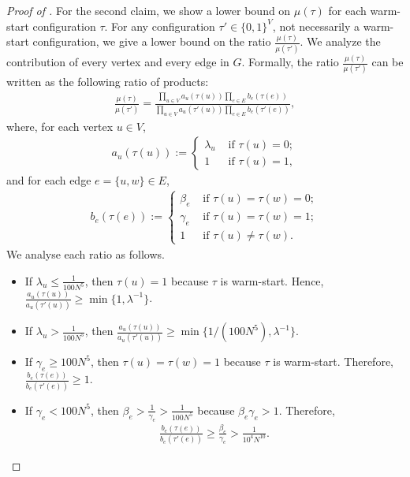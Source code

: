 \documentclass[10pt,a4paper]{amsart}
\newcommand{\defeq}{:=}
\begin{document}
\begin{proof}[Proof of ]
For the second claim, we show a lower bound on $\mu(\tau)$ for each warm-start configuration $\tau$. For any configuration $\tau' \in \{0,1\}^{V}$, not necessarily a warm-start configuration, we give a lower bound on the ratio $\frac{\mu(\tau)}{\mu(\tau')}$. We analyze the contribution of every vertex and every edge in $G$. Formally, the ratio $\frac{\mu(\tau)}{\mu(\tau')}$ can be written as the following ratio of products:
\begin{align*}
  \frac{\mu(\tau)}{\mu(\tau')} = \frac{ \prod_{u \in V} a_u(\tau(u)) \prod_{e \in E} b_e(\tau(e)) }{ \prod_{u \in V} a_u(\tau'(u)) \prod_{e \in E} b_e(\tau'(e)) },
\end{align*}
where, for each vertex $u \in V$,
\begin{align*}
  a_u(\tau(u))\defeq
  \begin{cases}
    \lambda_u & \text{ if }\tau(u) = 0;\\
    1 & \text{ if }\tau(u) = 1,
  \end{cases}
\end{align*}
and for each edge $e = \{u,w\} \in E$,
\begin{align*}
  b_e(\tau(e))\defeq
  \begin{cases}
    \beta_e & \text{ if }\tau(u) = \tau(w) = 0;\\
    \gamma_e & \text{ if }\tau(u) = \tau(w) = 1;\\    
    1 & \text{ if }\tau(u) \neq \tau(w).
  \end{cases}
\end{align*}
We analyse each ratio as follows.
\begin{itemize}
    \item If $\lambda_u \leq \frac{1}{100N^5}$, then $\tau(u) = 1$ because $\tau$ is warm-start. Hence, $\frac{a_u(\tau(u))}{a_u(\tau'(u))} \geq \min\{1,\lambda^{-1}\}$.
    \item If $\lambda_u > \frac{1}{100N^5}$, then $\frac{a_u(\tau(u))}{a_u(\tau'(u))} \geq \min\{1/(100N^5),\lambda^{-1}\}$.
    \item If $\gamma_e \geq 100N^5$, then $\tau(u) = \tau(w) = 1$ because $\tau$ is warm-start. Therefore, $\frac{b_e(\tau(e))}{b_e(\tau'(e))} \geq 1$.
    \item If $\gamma_e < 100N^5$, then $\beta_e > \frac{1}{\gamma_e} > \frac{1}{100N^5}$ because $\beta_e \gamma_e > 1$. Therefore,
    \begin{align*}
        \frac{b_e(\tau(e))}{b_e(\tau'(e))} \geq \frac{\beta_e}{\gamma_e} > \frac{1}{10^4 N^{10}}.
    \end{align*}

\end{itemize}
\end{proof}
\end{document}
